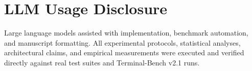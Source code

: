 \documentclass[11pt]{article}
\begin{document}
\section{LLM Usage Disclosure}
Large language models assisted with implementation, benchmark automation, and manuscript formatting. All experimental protocols, statistical analyses, architectural claims, and empirical measurements were executed and verified directly against real test suites and Terminal-Bench v2.1 runs.
\end{document}

